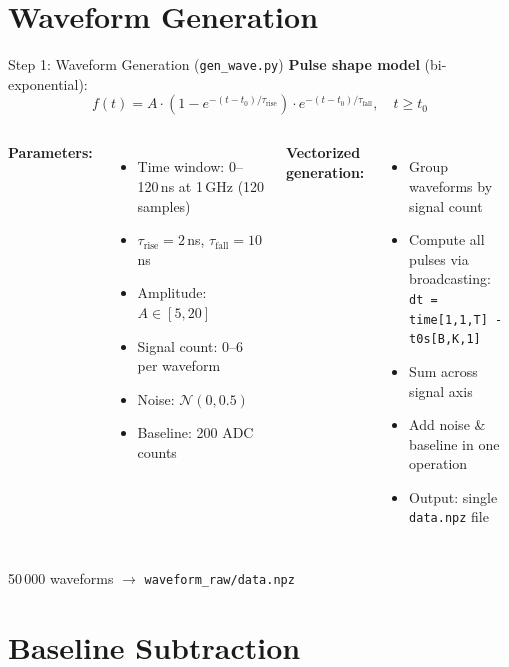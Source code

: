 \documentclass[aspectratio=169]{beamer}
\begin{document}
\section{Waveform Generation}

\begin{frame}{Step 1: Waveform Generation (\texttt{gen\_wave.py})}
\textbf{Pulse shape model} (bi-exponential):
\[
  f(t) = A \cdot \left(1 - e^{-(t-t_0)/\tau_\text{rise}}\right) \cdot e^{-(t-t_0)/\tau_\text{fall}}, \quad t \geq t_0
\]

\medskip
\begin{columns}[T]
\textbf{Parameters:}
\begin{itemize}
  \item Time window: 0--120\,ns at 1\,GHz (120 samples)
  \item $\tau_\text{rise} = 2$\,ns, $\tau_\text{fall} = 10$\,ns
  \item Amplitude: $A \in [5, 20]$
  \item Signal count: 0--6 per waveform
  \item Noise: $\mathcal{N}(0, 0.5)$
  \item Baseline: 200 ADC counts
\end{itemize}

\textbf{Vectorized generation:}
\begin{itemize}
  \item Group waveforms by signal count
  \item Compute all pulses via broadcasting:\\
        \texttt{dt = time[1,1,T] - t0s[B,K,1]}
  \item Sum across signal axis
  \item Add noise \& baseline in one operation
  \item Output: single \texttt{data.npz} file
\end{itemize}
\end{columns}

\medskip
\begin{center}
\small 50\,000 waveforms $\rightarrow$ \texttt{waveform\_raw/data.npz}
\end{center}
\end{frame}

\section{Baseline Subtraction}
\end{document}
